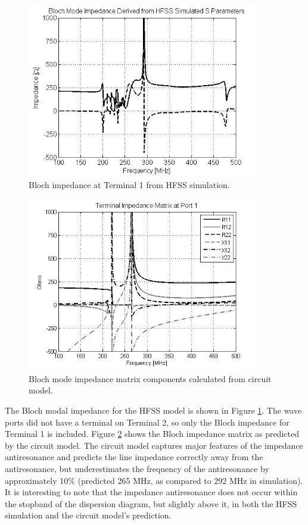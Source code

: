 \documentclass{allertonproc}
\begin{document}
\begin{figure}[hbtp]
\begin{center}
\includegraphics[width=4in]{HFSSZbloch}
\caption{Bloch impedance at Terminal 1 from HFSS simulation.}
\label{HFSSZbloch}
\end{center}
\end{figure}
\begin{figure}[htbp]
\begin{center}
\includegraphics[width=4in]{cktZbloch}
\caption{Bloch mode impedance matrix components calculated from circuit model.}
\label{cktZbloch}
\end{center}
\end{figure}
The Bloch modal impedance for the HFSS model is shown in Figure \ref{HFSSZbloch}.  The wave ports did not have a terminal on Terminal 2, so only the Bloch impedance for Terminal 1 is included.  Figure \ref{cktZbloch} shows the Bloch impedance matrix as predicted by the circuit model.  The circuit model captures major features of the impedance antiresonance and predicts the line impedance correctly away from the antiresonance, but underestimates the frequency of the antiresonance by approximately 10\% (predicted 265 MHz, as compared to 292 MHz in simulation).  It is interesting to note that the impedance antiresonance does not occur within the stopband of the dispersion diagram, but slightly above it, in both the HFSS simulation and the circuit model's prediction.  
\end{document}
